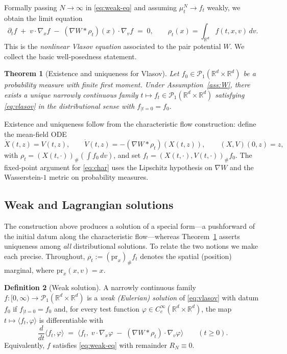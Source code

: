 \documentclass[11pt]{article}
\newtheorem{theorem}{Theorem}
\theoremstyle{definition}
\newtheorem{definition}[theorem]{Definition}
\theoremstyle{remark}
\newcommand{\R}{\mathbb{R}}
\begin{document}
Formally passing $N \to \infty$ in \eqref{eq:weak-eq} and assuming $\mu_t^N \to f_t$ weakly, we
obtain the limit equation
\begin{equation}
  \boxed{\;\partial_t f \;+\; v \cdot \nabla_x f \;-\; (\nabla W * \rho_t)(x) \cdot \nabla_v f \;=\; 0,
  \qquad \rho_t(x) = \int_{\R^d} f(t, x, v) \, dv.\;}
  \label{eq:vlasov}
\end{equation}
This is the \emph{nonlinear Vlasov equation} associated to the pair potential $W$. We collect
the basic well-posedness statement.

\begin{theorem}[Existence and uniqueness for Vlasov]\label{thm:vlasov-wp}
Let $f_0 \in \mathcal{P}_1(\R^d \times \R^d)$ be a probability measure with finite first moment.
Under Assumption~\ref{ass:W}, there exists a unique narrowly continuous family
$t \mapsto f_t \in \mathcal{P}_1(\R^d \times \R^d)$ satisfying \eqref{eq:vlasov} in the
distributional sense with $f_{|t=0} = f_0$.
\end{theorem}

Existence and uniqueness follow from the characteristic flow construction: define the mean-field
ODE
\begin{equation}
  \dot{X}(t,z) = V(t,z), \qquad \dot{V}(t,z) = -(\nabla W * \rho_t)(X(t,z)),
  \qquad (X,V)(0,z) = z,
  \label{eq:char}
\end{equation}
with $\rho_t = (X(t,\cdot))_\# (\int f_0\, dv)$, and set $f_t = (X(t,\cdot), V(t,\cdot))_\# f_0$.
The fixed-point argument for \eqref{eq:char} uses the Lipschitz hypothesis on $\nabla W$ and
the Wasserstein-$1$ metric on probability measures.

\subsection*{Weak and Lagrangian solutions}\label{sec:weak-lagrangian}

The construction above produces a solution of a special form---a pushforward of the
initial datum along the characteristic flow---whereas Theorem~\ref{thm:vlasov-wp}
asserts uniqueness among \emph{all} distributional solutions. To relate the two
notions we make each precise. Throughout, $\rho_t := (\mathrm{pr}_x)_\# f_t$ denotes
the spatial (position) marginal, where $\mathrm{pr}_x(x,v) = x$.

\begin{definition}[Weak solution]\label{def:weak-sol}
A narrowly continuous family $f : [0,\infty) \to \mathcal{P}_1(\R^d \times \R^d)$ is a
\emph{weak (Eulerian) solution} of \eqref{eq:vlasov} with datum $f_0$ if $f_{|t=0} = f_0$
and, for every test function $\varphi \in C_c^\infty(\R^d \times \R^d)$, the map
$t \mapsto \langle f_t, \varphi \rangle$ is differentiable with
\begin{equation}
  \frac{d}{dt} \langle f_t, \varphi \rangle
  \;=\; \big\langle f_t,\; v \cdot \nabla_x \varphi
        \;-\; (\nabla W * \rho_t) \cdot \nabla_v \varphi \big\rangle
  \qquad (t \ge 0).
  \label{eq:weak-sol}
\end{equation}
Equivalently, $f$ satisfies \eqref{eq:weak-eq} with remainder $R_N \equiv 0$.
\end{definition}
\end{document}
